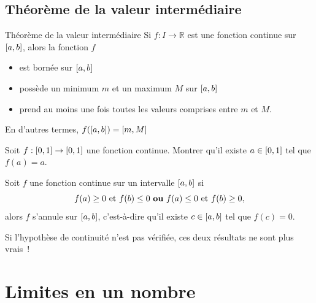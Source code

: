 \documentclass[a4paper,12pt]{article}
\begin{document}
\subsection{Théorème de la valeur intermédiaire}
\begin{thm}
Théorème de la valeur intermédiaire
\tcblower
Si $f : I \to \mathbb{R}$ est une fonction continue sur $\interval{a}{b}$, alors la fonction $f$
\begin{itemize}
	\item est bornée sur $\interval{a}{b}$
	\item possède un minimum $m$ et un maximum $M$ sur $\interval{a}{b}$
	\item prend au moins une fois toutes les valeurs comprises entre $m$ et $M$.
\end{itemize}
En d'autres termes, $f(\interval{a}{b}) = \interval{m}{M}$
\end{thm}
\begin{exemple}
	\tcblower
	Soit $f:\interval{0}{1}\rightarrow\interval{0}{1}$ une fonction continue. Montrer qu'il existe $a\in\interval{0}{1}$ tel que $f(a)=a$.
	\vspace{6cm}
\end{exemple}
\begin{coro}
	\tcblower
	Soit $f$ une fonction continue sur un intervalle $\interval{a}{b}$ si 
	\[f(a)\geq 0 \text{ et } f(b) \leq 0 \text{ {\bfseries ou} } f(a)\leq 0 \text{ et } f(b)\geq 0,\]
	alors $f$ s'annule sur $\interval{a}{b}$, c'est-à-dire qu'il existe $c\in \interval{a}{b}$ tel que $f(c)=0$. 
\end{coro}
\begin{remarque}
	\tcblower
Si l'hypothèse de continuité n'est pas vérifiée, ces deux résultats ne sont plus vrais~!
\end{remarque}



\section{Limites en un nombre}
\end{document}
